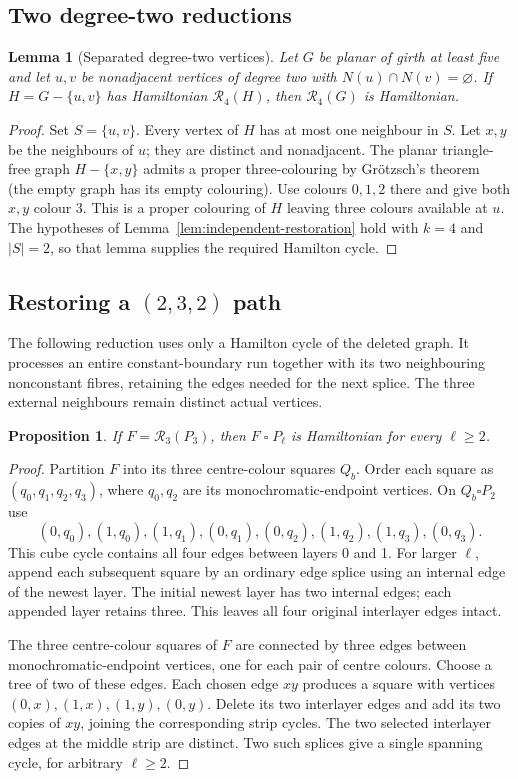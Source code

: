 \documentclass[11pt]{article}
\newtheorem{lemma}[theorem]{Lemma}
\newtheorem{proposition}[theorem]{Proposition}
\theoremstyle{remark}
\newcommand{\R}{\mathcal R}
\numberwithin{equation}{section}
\numberwithin{table}{section}
\begin{document}
\subsection{Two degree-two reductions}
\begin{lemma}[Separated degree-two vertices]\label{lem:separated-two-g5}
Let $G$ be planar of girth at least five and let $u,v$ be nonadjacent
vertices of degree two with $N(u)\cap N(v)=\varnothing$.  If
$H=G-\{u,v\}$ has Hamiltonian $\R_4(H)$, then $\R_4(G)$ is Hamiltonian.
\end{lemma}
\begin{proof}
Set $S=\{u,v\}$.  Every vertex of $H$ has at most one neighbour in $S$.
Let $x,y$ be the neighbours of $u$; they are distinct and nonadjacent.
The planar triangle-free graph $H-\{x,y\}$ admits a proper three-colouring
by Gr\"otzsch's theorem~\cite{Grotzsch59} (the empty graph has its empty
colouring).  Use colours $0,1,2$ there and give both $x,y$ colour $3$.
This is a proper colouring of $H$ leaving three colours available at $u$.
The hypotheses of Lemma~\ref{lem:independent-restoration} hold with
$k=4$ and $|S|=2$, so that lemma supplies the required Hamilton cycle.
\end{proof}

\subsection{\texorpdfstring{Restoring a $(2,3,2)$ path}{Restoring a (2,3,2) path}}
The following reduction uses only a Hamilton cycle of the deleted graph.
It processes an entire constant-boundary run together with its two
neighbouring nonconstant fibres, retaining the edges needed for the next
splice.  The three external neighbours remain distinct actual vertices.
\begin{proposition}\label{prop:badrun}
If $F=\R_3(P_3)$, then $F\mathbin{\square}P_\ell$ is Hamiltonian
for every $\ell\ge2$.
\end{proposition}
\begin{proof}
Partition $F$ into its three centre-colour squares $Q_b$.
Order each square as $(q_0,q_1,q_2,q_3)$, where $q_0,q_2$ are
its monochromatic-endpoint vertices. On $Q_b\square P_2$ use
\[
 (0,q_0),(1,q_0),(1,q_1),(0,q_1),
 (0,q_2),(1,q_2),(1,q_3),(0,q_3).
\]
This cube cycle contains all four edges between layers 0 and 1.
For larger $\ell$, append each subsequent square by an ordinary
edge splice using an internal edge of the newest layer. The initial
newest layer has two internal edges; each appended layer retains
three. This leaves all four original interlayer edges intact.

The three centre-colour squares of $F$ are connected by three edges
between monochromatic-endpoint vertices, one for each pair of
centre colours. Choose a tree of two of these edges. Each chosen
edge $xy$ produces a square with vertices $(0,x),(1,x),(1,y),(0,y)$.
Delete its two interlayer edges and add its two copies of $xy$,
joining the corresponding strip cycles. The two selected interlayer
edges at the middle strip are distinct. Two such splices give a
single spanning cycle, for arbitrary $\ell\ge2$.
\end{proof}
\end{document}

